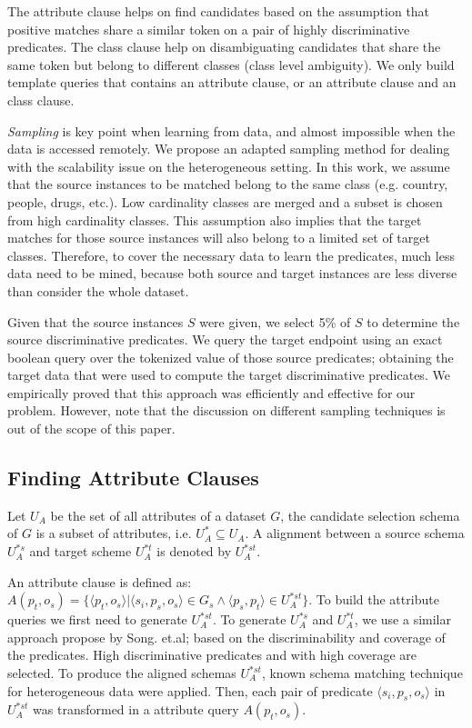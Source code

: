 The attribute clause helps on find candidates based on the assumption that positive matches share a similar token on a pair of highly discriminative predicates. The class clause help on disambiguating candidates that share the same token but belong to different classes (class level ambiguity).  We only build template queries that contains an attribute clause, or an attribute clause and an class clause. 


\emph{Sampling} is key point when learning from data, and almost impossible when the data is accessed remotely. We propose an adapted sampling method for dealing with the scalability issue on the heterogeneous setting. In this work, we assume that the source instances to be matched belong to the same class (e.g. country, people, drugs, etc.). Low cardinality classes are merged and a subset is chosen from high cardinality classes. This assumption also implies that the target matches for those source instances will also belong to a limited set of target classes. Therefore, to cover the necessary data to learn the predicates, much less data need to be mined, because both source and target instances are less diverse than consider the whole dataset.

Given that the source instances $S$ were given, we select 5\% of $S$ to determine the source discriminative predicates. We query the target endpoint using an exact boolean query over the tokenized value of those source predicates; obtaining the target data that were used to compute the target discriminative predicates. We empirically proved that this approach was efficiently and effective for our problem. However, note that the discussion on different sampling techniques is out of the scope of this paper.

\subsection{Finding Attribute Clauses}

Let $U_A$ be the set of all attributes of a dataset $G$, the candidate selection schema of $G$ is a subset of attributes, i.e. $U^*_A  \subseteq U_A$.  A alignment between a source schema $U^{*s}_A$ and target scheme $U^{*t}_A$ is denoted by $U^{*st}_A$.

An attribute clause is defined as: $A(p_t,o_s)=\{\langle p_t,o_s \rangle | \langle s_i, p_s, o_s \rangle \in G_s \land \langle p_s, p_t \rangle \in U^{*st}_A\}$. To build the attribute queries we first need to generate $U^{*st}_A$. To generate $U^{*s}_A$ and $U^{*t}_A$, we use a similar approach propose by Song. et.al; based on the discriminability and coverage of the predicates. High discriminative predicates and with high coverage are selected. To produce the aligned schemas $U^{*st}_A$, known schema matching technique for heterogeneous data were applied. Then, each pair of predicate $\langle s_i, p_s, o_s \rangle$ in $U^{*st}_A$ was transformed in a attribute query $A(p_t,o_s)$.

